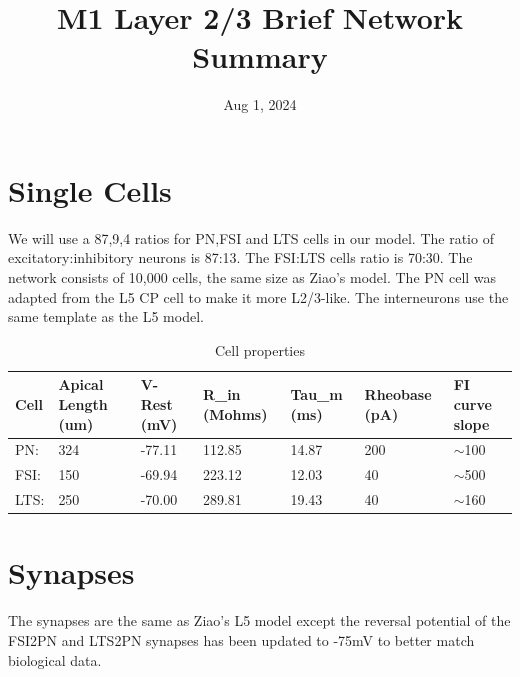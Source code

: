 \documentclass[12pt, letterpaper]{article}
\title{M1 Layer 2/3 Brief Network Summary}
\date{Aug 1, 2024}
\begin{document}
\pagestyle{empty} %
\maketitle
\thispagestyle{empty} %

\section*{Single Cells}
We will use a 87,9,4 ratios for PN,FSI and LTS cells in our model. 
The ratio of excitatory:inhibitory neurons is 87:13\cite{Lefort2009}. 
The FSI:LTS cells ratio is 70:30\cite{Kätzel2010}\cite{Wall2016}.
The network consists of 10,000 cells, the same size as Ziao's model. 
The PN cell was adapted from the L5 CP cell to make it more L2/3-like\cite{Hirai2012}. 
The interneurons use the same template as the L5 model.

\begin{table}[H]
  \centering
  \caption{Cell properties}
  \begin{tabularx}{\textwidth}{|X|X|X|X|X|X|X|}
  \hline
  Cell & Apical Length (um) & V-Rest (mV) & R\_in (Mohms) & Tau\_m (ms) & Rheobase (pA) & FI curve slope \\ \hline
  PN:  & 324\cite{Ledergerber2010} & -77.11\cite{Hirai2012} & 112.85\cite{Hirai2012}  & 14.87\cite{Hirai2012}  & 200\cite{Hirai2012}   & $\sim$100\cite{Hirai2012}      \\ \hline
  FSI: & 150               & -69.94\cite{Tanaka2011}     & 223.12\cite{Tanaka2011}       & 12.03\cite{Tanaka2011}      & 40           & $\sim$500      \\ \hline
  LTS: & 250               & -70.00\cite{Tanaka2011}     & 289.81\cite{Tanaka2011}       & 19.43\cite{Tanaka2011}      & 40           & $\sim$160      \\ \hline
  \end{tabularx}
\end{table}

\section*{Synapses}
The synapses are the same as Ziao's L5 model except the reversal potential of the FSI2PN and LTS2PN synapses has been updated to -75mV to better match biological data\cite{Beierlein2003}.
\end{document}

